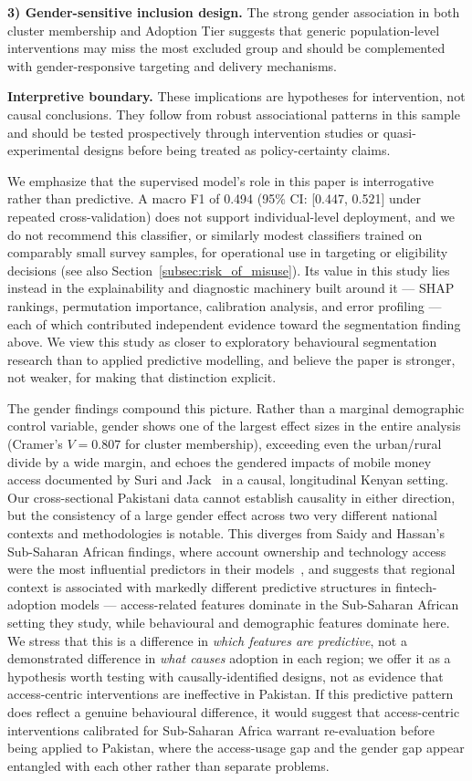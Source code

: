 \documentclass[conference]{IEEEtran}
\begin{document}
\textbf{3) Gender-sensitive inclusion design.} The strong gender
association in both cluster membership and Adoption Tier suggests that
generic population-level interventions may miss the most excluded group
and should be complemented with gender-responsive targeting and delivery
mechanisms.

\textbf{Interpretive boundary.} These implications are hypotheses for
intervention, not causal conclusions. They follow from robust
associational patterns in this sample and should be tested prospectively
through intervention studies or quasi-experimental designs before being
treated as policy-certainty claims.

We emphasize that the supervised model's role in this paper is
interrogative rather than predictive. A macro F1 of 0.494 (95\% CI:
[0.447, 0.521] under repeated cross-validation) does not support
individual-level deployment, and we do not recommend this classifier, or
similarly modest classifiers trained on comparably small survey samples,
for operational use in targeting or eligibility decisions (see also
Section~\ref{subsec:risk_of_misuse}). Its value in this study lies instead in the explainability
and diagnostic machinery built around it --- SHAP rankings, permutation
importance, calibration analysis, and error profiling --- each of which
contributed independent evidence toward the segmentation finding above. We
view this study as closer to exploratory behavioural segmentation research
than to applied predictive modelling, and believe the paper is stronger,
not weaker, for making that distinction explicit.

The gender findings compound this picture. Rather than a marginal
demographic control variable, gender shows one of the largest effect sizes
in the entire analysis (Cramer's $V = 0.807$ for cluster membership),
exceeding even the urban/rural divide by a wide margin, and echoes the
gendered impacts of mobile money access documented by Suri and
Jack~\cite{surijack2016} in a causal, longitudinal Kenyan setting. Our
cross-sectional Pakistani data cannot establish causality in either
direction, but the consistency of a large gender effect across two very
different national contexts and methodologies is notable. This diverges
from Saidy and Hassan's Sub-Saharan African findings, where account
ownership and technology access were the most influential predictors in
their models~\cite{saidy2025}, and suggests that regional context is
associated with markedly different predictive structures in
fintech-adoption models --- access-related features dominate in the
Sub-Saharan African setting they study, while behavioural and demographic
features dominate here. We stress that this is a difference in
\emph{which features are predictive}, not a demonstrated difference in
\emph{what causes} adoption in each region; we offer it as a hypothesis
worth testing with causally-identified designs, not as evidence that
access-centric interventions are ineffective in Pakistan. If this
predictive pattern does reflect a genuine behavioural difference, it would
suggest that access-centric interventions calibrated for Sub-Saharan
Africa warrant re-evaluation before being applied to Pakistan, where the
access-usage gap and the gender gap appear entangled with each other
rather than separate problems.
\end{document}
